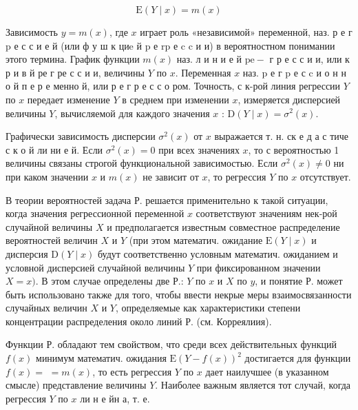 \documentclass[10pt]{article}
\begin{document}
\[

\mathrm{E}(Y \mid x)=m(x)

\]



Зависимость $y=m(x)$, где $x$ играет роль «независимой» переменной, наз. р е г p е с с и е й (или ф у ш к циe й $\mathrm{p}$ е $\mathrm{r} \mathrm{p}$ е c c и и) в вероятностном понимании этого термина. График функции $m(x)$ наз. л и н и е й $\mathrm{p} \mathrm{e}-$ г р е с с и и, или к р и в й ре г ре с с и и, величины $Y$ по $x$. Переменная $x$ наз. $\mathrm{p}$ е г $\mathrm{p}$ е с $\mathrm{c}$ и о н н о й п е р е менно й, или р е г р е с с о ром. Точность, с к-рой линия регрессии $Y$ по $x$ передает изменение $Y$ в среднем при изменении $x$, измеряется дисперсией величины $Y$, вычисляемой для каждого значения $x$ : $\mathrm{D}(Y \mid x)=\sigma^{2}(x)$.



Графически зависимость дисперсии $\sigma^{2}(x)$ от $x$ выражается т. н. ск е д а с тиче с к о й ли ни е й. Если $\sigma^{2}(x)=0$ при всех значениях $x$, то с вероятностью 1 величины связаны строгой функциональной зависимостью. Если $\sigma^{2}(x) \neq 0$ ни при каком значении $x$ и $m(x)$ не зависит от $x$, то регрессия $Y$ по $x$ отсутствует.



В теории вероятностей задача Р. решается применительно к такой ситуации, когда значения регрессионной переменной $x$ соответствуют значениям нек-рой случайной величины $X$ и предполагается известным совместное распределение вероятностей величин $X$ и $Y$ (при этом математич. ожидание $\mathrm{E}(Y \mid x)$ и дисперсия $\mathrm{D}(Y \mid x)$ будут соответственно условным математич. ожиданием и условной дисперсией случайной величины $Y$ при фиксированном значении $X=x)$. В этом случае определены две Р.: $Y$ по $x$ и $X$ по $y$, и понятие Р. может быть использовано также для того, чтобы ввести некрые меры взаимосвязанности случайных величин $X$ и $Y$, определяемые как характеристики степени концентрации распределения около линий Р. (см. Корреялиия).



Функции Р. обладают тем свойством, что среди всех действительных функций $f(x)$ минимум математич. ожидания $\mathrm{E}(Y-f(x))^{2}$ достигается для функции $f(x)=$ $=m(x)$, то есть регрессия $Y$ по $x$ дает наилучшее (в указанном смысле) представление величины $Y$. Наиболее важным является тот случай, когда регрессия $Y$ по $x$ ли н е йн а, т. е.
\end{document}
